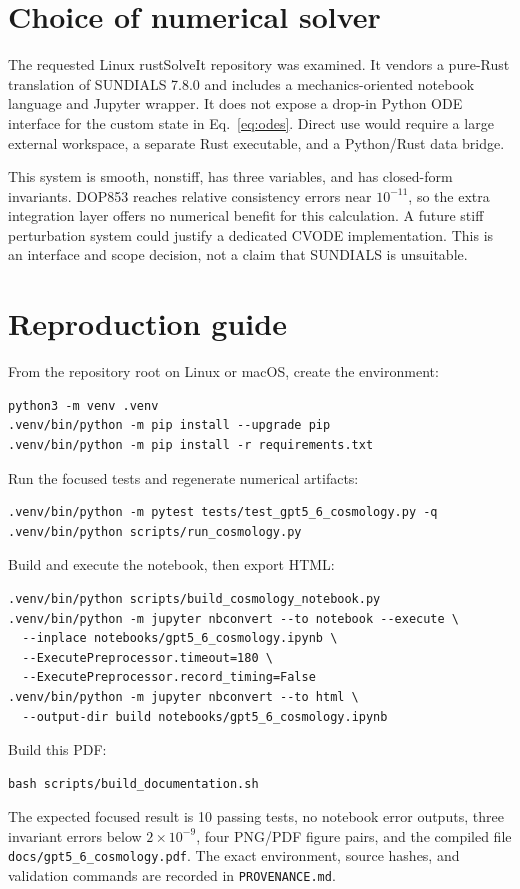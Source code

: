 \documentclass[11pt]{article}
\begin{document}
\section{Choice of numerical solver}

The requested Linux rustSolveIt repository \cite{rustsolveit} was examined.  It
vendors a pure-Rust translation of SUNDIALS 7.8.0 and includes a
mechanics-oriented notebook language and Jupyter wrapper.  It does not expose a
drop-in Python ODE interface for the custom state in Eq.~\eqref{eq:odes}.
Direct use would require a large external workspace, a separate Rust executable,
and a Python/Rust data bridge.

This system is smooth, nonstiff, has three variables, and has closed-form
invariants.  DOP853 reaches relative consistency errors near $10^{-11}$, so the
extra integration layer offers no numerical benefit for this calculation.  A
future stiff perturbation system could justify a dedicated CVODE implementation.
This is an interface and scope decision, not a claim that SUNDIALS is
unsuitable.

\section{Reproduction guide}

From the repository root on Linux or macOS, create the environment:
\begin{verbatim}
python3 -m venv .venv
.venv/bin/python -m pip install --upgrade pip
.venv/bin/python -m pip install -r requirements.txt
\end{verbatim}
Run the focused tests and regenerate numerical artifacts:
\begin{verbatim}
.venv/bin/python -m pytest tests/test_gpt5_6_cosmology.py -q
.venv/bin/python scripts/run_cosmology.py
\end{verbatim}
Build and execute the notebook, then export HTML:
\begin{verbatim}
.venv/bin/python scripts/build_cosmology_notebook.py
.venv/bin/python -m jupyter nbconvert --to notebook --execute \
  --inplace notebooks/gpt5_6_cosmology.ipynb \
  --ExecutePreprocessor.timeout=180 \
  --ExecutePreprocessor.record_timing=False
.venv/bin/python -m jupyter nbconvert --to html \
  --output-dir build notebooks/gpt5_6_cosmology.ipynb
\end{verbatim}
Build this PDF:
\begin{verbatim}
bash scripts/build_documentation.sh
\end{verbatim}
The expected focused result is 10 passing tests, no notebook error outputs,
three invariant errors below $2\times10^{-9}$, four PNG/PDF figure pairs, and
the compiled file \texttt{docs/gpt5\_6\_cosmology.pdf}.  The exact environment,
source hashes, and validation commands are recorded in
\texttt{PROVENANCE.md}.
\end{document}

